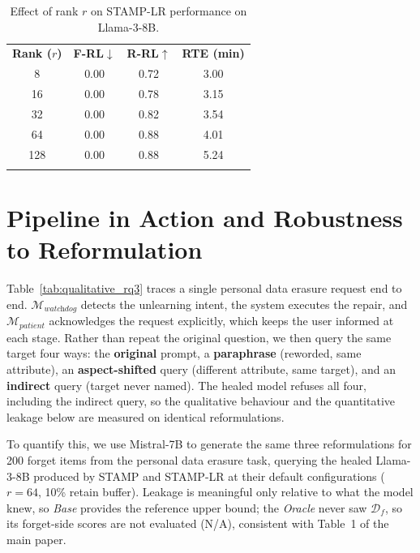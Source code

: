 \begin{table}[H]
\centering
\caption{Effect of rank $r$ on STAMP-LR performance on Llama-3-8B.}
\label{tab:rank_analysis}
\small
\renewcommand{\arraystretch}{1.3}
\begin{tabular}{c|ccc}
\Xhline{1.15pt}
\textbf{Rank ($r$)} & \textbf{F-RL}$\downarrow$ & \textbf{R-RL}$\uparrow$ & \textbf{RTE (min)} \\
\Xhline{1.15pt}
\rowcolor{gray!15}
8   & 0.00 & 0.72 & 3.00 \\
16  & 0.00 & 0.78 & 3.15 \\
\rowcolor{gray!15}
32  & 0.00 & 0.82 & 3.54 \\
64  & 0.00 & 0.88 & 4.01 \\
\rowcolor{gray!15}
128 & 0.00 & 0.88 & 5.24 \\
\Xhline{1.15pt}
\end{tabular}
\end{table}

\section{Pipeline in Action and Robustness to Reformulation}
\label{sup:rq3}

Table~\ref{tab:qualitative_rq3} traces a single personal data erasure request end to end. $\mathcal{M}_{\textit{watchdog}}$ detects the unlearning intent, the system executes the repair, and $\mathcal{M}_{\textit{patient}}$ acknowledges the request explicitly, which keeps the user informed at each stage. Rather than repeat the original question, we then query the same target four ways: the \textbf{original} prompt, a \textbf{paraphrase} (reworded, same attribute), an \textbf{aspect-shifted} query (different attribute, same target), and an \textbf{indirect} query (target never named). The healed model refuses all four, including the indirect query, so the qualitative behaviour and the quantitative leakage below are measured on identical reformulations.

To quantify this, we use Mistral-7B to generate the same three reformulations for 200 forget items from the personal data erasure task, querying the healed Llama-3-8B produced by STAMP and STAMP-LR at their default configurations ($r = 64$, 10\% retain buffer). Leakage is meaningful only relative to what the model knew, so \textit{Base} provides the reference upper bound; the \textit{Oracle} never saw $\mathcal{D}_f$, so its forget-side scores are not evaluated (N/A), consistent with Table~1 of the main paper. %

